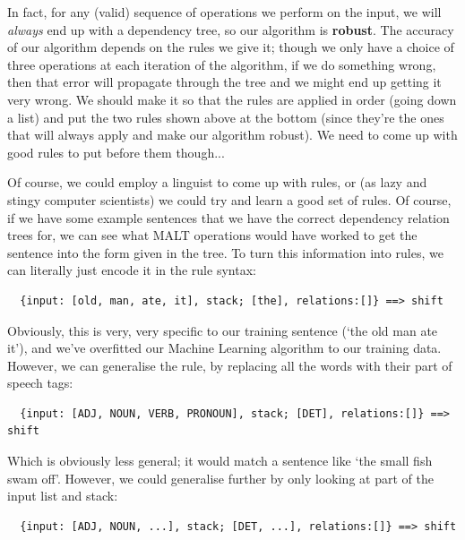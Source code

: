 In fact, for any (valid) sequence of operations we perform on the input, we will
\textit{always} end up with a dependency tree, so our algorithm is
\textbf{robust}. The accuracy of our algorithm depends on the rules we give it;
though we only have a choice of three operations at each iteration of the
algorithm, if we do something wrong, then that error will propagate through the
tree and we might end up getting it very wrong. We should make it so that the
rules are applied in order (going down a list) and put the two rules shown above
at the bottom (since they're the ones that will always apply and make our
algorithm robust). We need to come up with good rules to put before them
though...


Of course, we could employ a linguist to come up with rules, or (as lazy and
stingy computer scientists) we could try and learn a good set of rules. Of
course, if we have some example sentences that we have the correct dependency
relation trees for, we can see what MALT operations would have worked to get the
sentence into the form given in the tree. To turn this information into rules,
we can literally just encode it in the rule syntax:

\begin{verbatim}
  {input: [old, man, ate, it], stack; [the], relations:[]} ==> shift
\end{verbatim}

Obviously, this is very, very specific to our training sentence (`the old man
ate it'), and we've overfitted our Machine Learning algorithm to our training
data. However, we can generalise the rule, by replacing all the words with their
part of speech tags:

\begin{verbatim}
  {input: [ADJ, NOUN, VERB, PRONOUN], stack; [DET], relations:[]} ==> shift
\end{verbatim}

Which is obviously less general; it would match a sentence like `the small fish
swam off'. However, we could generalise further by only looking at part of the
input list and stack:

\begin{verbatim}
  {input: [ADJ, NOUN, ...], stack; [DET, ...], relations:[]} ==> shift
\end{verbatim}

